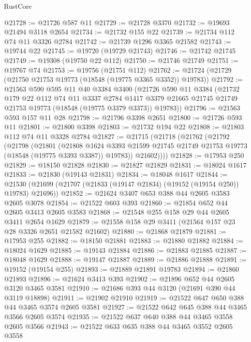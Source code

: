 \begin{lexlean}{RustCore}
\begin{coremodule}
@21728 := @21726 @587 @11
@21729 := @21728 @3370
@21732 := @19693 @21494 @3118 @2654
@21734 := @21732 @155 @22
@21739 := @21734 @112 @74 @11 @3326 @2784
@21742 := @21739 @1296 @3365 @21582
@21743 := @19744 @22
@21745 := @19720 (@19729 @21743)
@21746 := @21742 @21745
@21749 := @19308 (@19750 @22 @112)
@21750 := @21746 @21749
@21751 := @19767 @74
@21753 := @19756 (@21751 @112)
@21762 := @21724 (@21729 (@21750 @21753 @19773 (@18548 (@19775 @3365 @3352)) @19783))
@21792 := @21563
    @590
    @595
    @11
    @40
    @3384
    @3400
    (@21726
      @590
      @11
      @3384
      (@21732
        @179
        @22
        @112
        @74
        @11
        @3337
        @2784
        @1417
        @3379
        @21665
        @21745
        @21749
        @21753
        @19773
        (@18548 (@19775 @3379 @3373))
        @19783))
@21796 := @21563 @593 @157 @11 @28
@21798 := @21796 @3398 @2651
@21800 := @21726 @593 @11
@21801 := @21800 @3398
@21803 := @21732 @194 @22
@21808 := @21803 @112 @74 @11 @3328 @2784
@21827 := @21715
    (@21718
      (@21762
        (@21792
          (@21798
            (@21801
              (@21808
                @1624
                @3393
                @21599
                @21745
                @21749
                @21753
                @19773
                (@18548 (@19775 @3393 @3387))
                @19783))
            @21602))))
@21828 := @17953 @250
@21829 := @18150 @21828
@21830 := @21827 @21829
@21831 := @18024 @1617
@21833 := @21830 (@19143 @21831)
@21834 := @18048 @1617
@21844 := @21530 (@21699 (@21707 (@21833 (@19147 @21834) (@19152 (@19154 @250)) @19783) @21696))
@21852 := @21624 @3407 @653 @388 @44 @2605 @3583 @2605 @3078
@21854 := @21522 @603 @393
@21860 := @21854 @652 @44 @2605 @3413 @2605 @3583
@21868 := @21548 @255 @158 @29 @44 @2605 @3411 @2654 @1629
@21879 := @21558 @158 @29 @3411 (@21564 @157 @23 @28 @3326 @2651 @21582 @21602)
@21880 := @21868 @21879
@21881 := @17953 @255
@21882 := @18150 @21881
@21883 := @21880 @21882
@21884 := @18024 @1629
@21885 := @19143 @21884
@21886 := @21883 @21885
@21887 := @18048 @1629
@21888 := @19147 @21887
@21889 := @21886 @21888
@21891 := @19152 (@19154 @255)
@21893 := @21889 @21891 @19783
@21894 := @21860 @21893
@21896 := @21624 @3413 @393
@21902 := @21896 @652 @44 @2605 @3120 @3465 @3581
@21910 := @21686 @393 @44 @3120 (@21691 @390 @44 @3119 @18898)
@21911 := @21902 @21910
@21919 := @21522 @647 @650 @388 @44 @3465 @3574 @2605 @3581
@21927 := @21522 @642 @645 @388 @44 @3465 @3566 @2605 @3574
@21935 := @21522 @637 @640 @388 @44 @3465 @3558 @2605 @3566
@21943 := @21522 @633 @635 @388 @44 @3465 @3552 @2605 @3558

\end{coremodule}
\end{lexlean}
